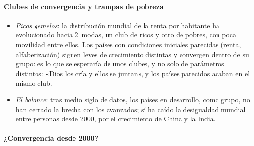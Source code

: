 \documentclass[11pt]{article}
\begin{document}
\begin{anotaciones}
\begin{figuracaja}
\caption{Convergencia $\sigma$: desviación típica del logaritmo del PIB por habitante, 1960-2023}\label{fig:convergencia-sigma}
\end{figuracaja}
\end{anotaciones}

\paragraph{Clubes de convergencia y trampas de pobreza}

\begin{itemize}
\item \emph{Picos gemelos}: la distribución mundial de la renta por habitante ha evolucionado hacia 2~modas, un club de ricos y otro de pobres, con poca movilidad entre ellos\nocite{Quah1996}. Los países con condiciones iniciales parecidas (renta, alfabetización) siguen leyes de crecimiento distintas y convergen dentro de su grupo\nocite{DurlaufJohnson1995}: es lo que se esperaría de unos clubes, y no solo de parámetros distintos: «Dios los cría y ellos se juntan», y los países parecidos acaban en el mismo club.
\item \emph{El balance}: tras medio siglo de datos, los países en desarrollo, como grupo, no han cerrado la brecha con los avanzados; sí ha caído la desigualdad mundial entre personas desde 2000, por el crecimiento de China y la India\nocite{JohnsonPapageorgiou2020}.
\end{itemize}

\paragraph{¿Convergencia desde 2000?}
\end{document}
